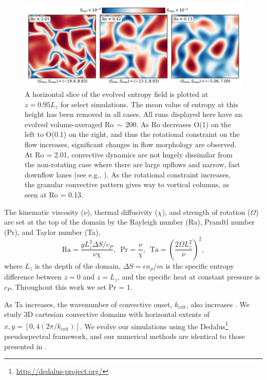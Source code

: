 \documentclass[twocolumn, amsmath, amsfonts, amssymb]{aastex62}
\begin{document}
\begin{figure}[t!]
\includegraphics[width=\textwidth]{./figs/dynamics_plot.png}
\caption{ A horizontal slice of the evolved entropy field is plotted at $z = 0.95L_z$
for select simulations. The mean value of entropy at this height has been removed in all
cases. All runs displayed here have an evolved volume-averaged Ro$\,\sim\,200$. 
As Ro decreases O(1) on the left to O(0.1) on the right, and thus the rotational
constraint on the flow increases, significant changes in flow morphology are observed.
At Ro = 2.01, convective dynamics are not hugely dissimilar from the non-rotating
case where there are large upflows and narrow, fast downflow lanes (see e.g., \AB).
As the rotational constraint increases, the granular convective pattern gives way
to vortical columns, as seen at Ro = 0.13.
\label{fig:pretty_convection} }
\end{figure}


The kinematic viscosity ($\nu$), thermal diffusivity ($\chi$), and strength of
rotation ($\Omega$) are set at the top of the domain by the Rayleigh number
(Ra), Prandtl number (Pr), and Taylor number (Ta),
\begin{equation}
\text{Ra} = \frac{g L_z^3 \Delta S / c_P}{\nu \chi}, \,\,\,
\text{Pr} = \frac{\nu}{\chi}, \,\,\,
\text{Ta} = \left(\frac{2 \Omega L_z^2}{\nu}\right)^2,
\end{equation}
where $L_z$ is the depth of the domain, 
$\Delta S = \epsilon n_\rho / m$ is the specific entropy difference between
$z = 0$ and $z = L_z$, and the specific heat at constant pressure is $c_P$.
Throughout this work we set Pr = 1.

As Ta increases, the wavenumber of convective onset, $k_{\text{crit}}$, also increases
\citep{calkins&all2015}. 
We study 3D cartesian convective domains with horizontal extents of
$x, y = [0, 4(2\pi/k_{\text{crit}})]$. 
We evolve our simulations using the Dedalus\footnote{\url{http://dedalus-project.org/}} 
pseudospectral framework, and our numerical methods are identical to those presented
in \AB.
\end{document}
